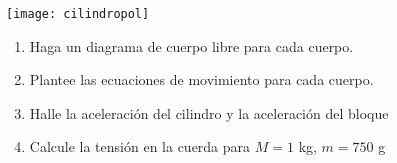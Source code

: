\begin{minipage}{9 cm}

\texttt{[image: cilindropol]}

\end{minipage}
\begin{minipage}{8 cm}
\begin{enumerate}
\item Haga un diagrama de cuerpo libre para cada cuerpo.
      \label{item:r3a}
\item Plantee las ecuaciones de movimiento para cada cuerpo.
      \label{item:r3b}
\item Halle la aceleración del cilindro y la aceleración del bloque
      \label{item:r3c}
\item Calcule la tensión en la cuerda para $M=1$ kg, $m=750$ g
      \label{item:r3d}
\end{enumerate}
\end{minipage}

